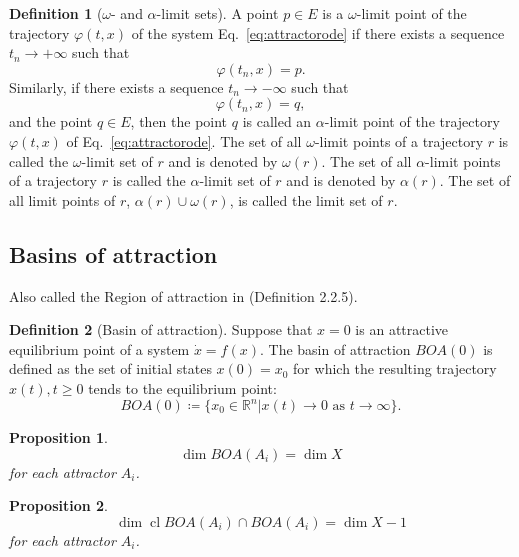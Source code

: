 \documentclass{article}
\newtheorem{proposition}{Proposition}
\theoremstyle{definition}
\newtheorem{definition}{Definition}
\theoremstyle{remark}
\newcommand{\reals}{\mathbb{R}}
\newcommand{\cl}{\operatorname{cl}}
\newcounter{ct}
\begin{document}
\begin{definition}[\(\omega\)- and \(\alpha\)-limit sets]
A point \( p \in E \) is a \(\omega\)-limit point of the trajectory \( \varphi(t, x) \) of the system Eq.~\ref{eq:attractorode} if there exists a sequence \( t_n \to +\infty \) such that
\[
\varphi(t_n, x) = p.
\]
Similarly, if there exists a sequence \( t_n \to -\infty \) such that
\[
\varphi(t_n, x) = q,
\]
and the point \( q \in E \), then the point \( q \) is called an \(\alpha\)-limit point of the trajectory \( \varphi(t, x) \) of  Eq.~\ref{eq:attractorode}. The set of all \(\omega\)-limit points of a trajectory \( r \) is called the \(\omega\)-limit set of \( r \) and is denoted by \( \omega(r) \). The set of all \(\alpha\)-limit points of a trajectory \( r \) is called the \(\alpha\)-limit set of \( r \) and is denoted by \( \alpha(r) \). The set of all limit points of \( r \), \( \alpha(r) \cup \omega(r) \), is called the limit set of \( r \).
\end{definition}


\subsection{Basins of attraction}
\citep{milnor1985attractor}
\citep{hirsch1995computing}

Also called the Region of attraction in \citep{garces2012strategies} (Definition 2.2.5).
\begin{definition}[Basin of attraction]
Suppose that $x=0$ is an attractive equilibrium point of a system $\dot x = f(x)$.
The basin of attraction $BOA(0)$ is defined as the set of initial states $x(0)=x_0$ for which the resulting trajectory $x(t), t\geq 0$ tends to the equilibrium point:
\begin{equation}
BOA(0) \coloneqq \{x_0\in \reals^n|x(t)\rightarrow0\text{ as } t\rightarrow\infty\}.
\end{equation}

\end{definition}


\begin{proposition}
\[\dim BOA(A_i) = \dim X\] for each attractor $A_i$.
\end{proposition}
\begin{proposition}
\[\dim\cl BOA(A_i) \cap BOA(A_i) = \dim X - 1 \] for each attractor $A_i$.
\end{proposition}
\end{document}
